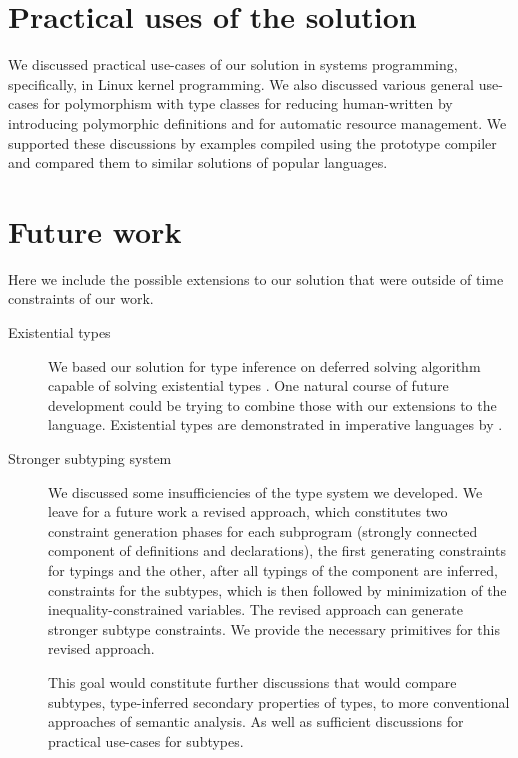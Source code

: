 \section*{Practical uses of the solution}

We discussed practical use-cases of our solution in systems programming, specifically, in Linux kernel programming. We also discussed various general use-cases for polymorphism with type classes for reducing human-written by introducing polymorphic definitions and for automatic resource management. We supported these discussions by examples compiled using the prototype compiler and compared them to similar solutions of popular languages.

\section*{Future work}

Here we include the possible extensions to our solution that were outside of time constraints of our work.

\begin{description}
    \item[Existential types] We based our solution for type inference on deferred solving algorithm capable of solving existential types \cite{vytiniotis2011outsidein}. One natural course of future development could be trying to combine those with our extensions to the language. Existential types are demonstrated in imperative languages by \cite{grossman2002existential}.

    \item[Stronger subtyping system] We discussed some insufficiencies of the type system we developed. We leave for a future work a revised approach, which constitutes two constraint generation phases for each subprogram (strongly connected component of definitions and declarations), the first generating constraints for typings and the other, after all typings of the component are inferred, constraints for the subtypes, which is then followed by minimization of the inequality-constrained variables. The revised approach can generate stronger subtype constraints. We provide the necessary primitives for this revised approach.

    This goal would constitute further discussions that would compare subtypes, type-inferred secondary properties of types, to more conventional approaches of semantic analysis. As well as sufficient discussions for practical use-cases for subtypes.
\end{description}
